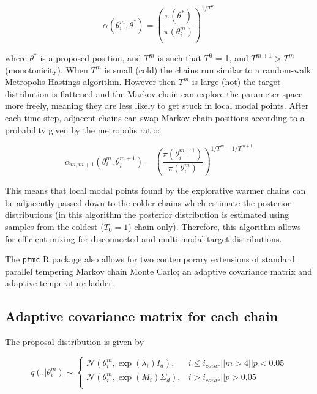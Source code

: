 \documentclass[10pt,twoside]{report} %
\begin{document}
$$\alpha(\theta_i^m, \theta^*) = \left(\frac{\pi (\theta^*)}{\pi (\theta^m_i)}\right)^{1/T^m}$$

where $\theta^*$ is a proposed position, and $T^m$ is such that $T^0$ = 1, and $T^{m+1} > T^m$ (monotonicity). When $T^m$ is small (cold) the chains run similar to a random-walk Metropolis-Hastings algorithm. However then $T^m$ is large (hot) the target distribution is flattened and the Markov chain can explore the parameter space more freely, meaning they are less likely to get stuck in local modal points. After each time step, adjacent chains can swap Markov chain positions according to a probability given by the metropolis ratio:

$$\alpha_{m,m+1}(\theta_i^m, \theta_i^{m+1}) = \left(\frac{\pi(\theta_{i}^{m+1})}{\pi(\theta^{m}_i)}\right)^{1/T^m - 1/T^{m+1}}$$


This means that local modal points found by the explorative warmer chains can be adjacently passed down to the colder chains which estimate the posterior distributions (in this algorithm the posterior distribution is estimated using samples from the coldest ($T_0 = 1$) chain only). Therefore, this algorithm allows for efficient mixing for disconnected and multi-modal target distributions. 

The \texttt{ptmc} R package also allows for two contemporary extensions of standard parallel tempering Markov chain Monte Carlo; an adaptive covariance matrix and adaptive temperature ladder. 


\subsection{Adaptive covariance matrix for each chain}

The proposal distribution is given by 

$$
q(.|\theta_i^m) \sim \left\{\begin{array}{ll}
\mathcal{N}(\theta_i^m, \exp(\lambda_i)I_d), & i \leq i_{covar} ||  m>4 || p < 0.05  \\ 
\mathcal{N}(\theta_i^m, \exp(M_i)\Sigma_d),  & i > i_{covar} || p > 0.05    \\ 
\end{array} \right.
$$
\end{document}
